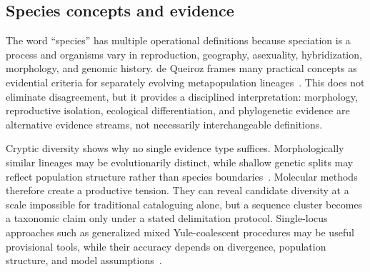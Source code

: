 \documentclass[conference]{IEEEtran}
\begin{document}
\subsection{Species concepts and evidence}

The word ``species'' has multiple operational definitions because speciation is a process and organisms vary in reproduction, geography, asexuality, hybridization, morphology, and genomic history. de Queiroz frames many practical concepts as evidential criteria for separately evolving metapopulation lineages~\cite{dequeiroz2007}. This does not eliminate disagreement, but it provides a disciplined interpretation: morphology, reproductive isolation, ecological differentiation, and phylogenetic evidence are alternative evidence streams, not necessarily interchangeable definitions.

Cryptic diversity shows why no single evidence type suffices. Morphologically similar lineages may be evolutionarily distinct, while shallow genetic splits may reflect population structure rather than species boundaries~\cite{bickford2007,leliaert2014}. Molecular methods therefore create a productive tension. They can reveal candidate diversity at a scale impossible for traditional cataloguing alone, but a sequence cluster becomes a taxonomic claim only under a stated delimitation protocol. Single-locus approaches such as generalized mixed Yule-coalescent procedures may be useful provisional tools, while their accuracy depends on divergence, population structure, and model assumptions~\cite{fujisawa2013}.
\end{document}
